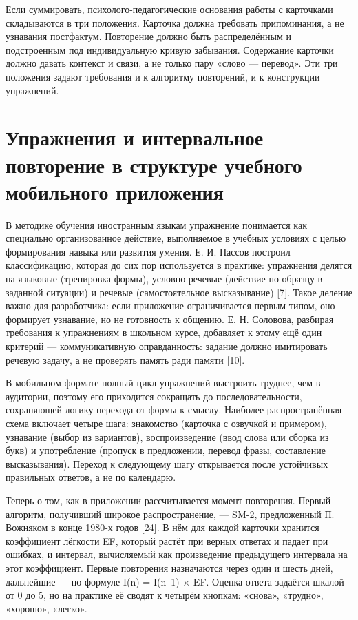 \documentclass[11pt,a4paper,openany]{report}
\begin{document}
Если суммировать, психолого-педагогические основания работы с карточками складываются в три положения. Карточка должна требовать припоминания, а не узнавания постфактум. Повторение должно быть распределённым и подстроенным под индивидуальную кривую забывания. Содержание карточки должно давать контекст и связи, а не только пару «слово — перевод». Эти три положения задают требования и к алгоритму повторений, и к конструкции упражнений.

\section{Упражнения и интервальное повторение в структуре учебного мобильного приложения}

В методике обучения иностранным языкам упражнение понимается как специально организованное действие, выполняемое в учебных условиях с целью формирования навыка или развития умения. Е. И. Пассов построил классификацию, которая до сих пор используется в практике: упражнения делятся на языковые (тренировка формы), условно-речевые (действие по образцу в заданной ситуации) и речевые (самостоятельное высказывание) [7]. Такое деление важно для разработчика: если приложение ограничивается первым типом, оно формирует узнавание, но не готовность к общению. Е. Н. Соловова, разбирая требования к упражнениям в школьном курсе, добавляет к этому ещё один критерий — коммуникативную оправданность: задание должно имитировать речевую задачу, а не проверять память ради памяти [10].

В мобильном формате полный цикл упражнений выстроить труднее, чем в аудитории, поэтому его приходится сокращать до последовательности, сохраняющей логику перехода от формы к смыслу. Наиболее распространённая схема включает четыре шага: знакомство (карточка с озвучкой и примером), узнавание (выбор из вариантов), воспроизведение (ввод слова или сборка из букв) и употребление (пропуск в предложении, перевод фразы, составление высказывания). Переход к следующему шагу открывается после устойчивых правильных ответов, а не по календарю.

Теперь о том, как в приложении рассчитывается момент повторения. Первый алгоритм, получивший широкое распространение, — SM-2, предложенный П. Вожняком в конце 1980-х годов [24]. В нём для каждой карточки хранится коэффициент лёгкости EF, который растёт при верных ответах и падает при ошибках, и интервал, вычисляемый как произведение предыдущего интервала на этот коэффициент. Первые повторения назначаются через один и шесть дней, дальнейшие — по формуле I(n) = I(n–1) × EF. Оценка ответа задаётся шкалой от 0 до 5, но на практике её сводят к четырём кнопкам: «снова», «трудно», «хорошо», «легко».
\end{document}
